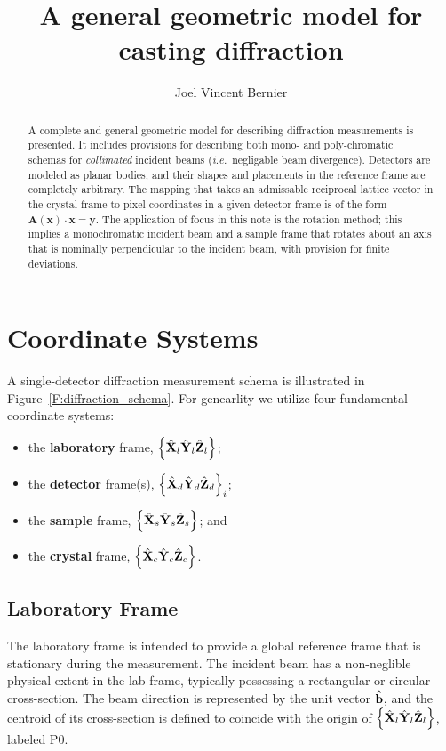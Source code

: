 \documentclass[12pt,letterpaper,final]{amsart}
\author{Joel Vincent Bernier}
\title{A general geometric model for casting diffraction}
\newcommand{\mbm}[1]{\ensuremath{\mbox{\boldmath$#1$}}}
\newcommand{\bhat}{\ensuremath{\hat{\mbm{\mathrm{b}}}}}
\newcommand{\Pzero}{\ensuremath{\mathrm{P0}}}
\newcommand{\Xl}{\ensuremath{\hat{\mbm{\mathrm{X}}}_l}}
\newcommand{\Yl}{\ensuremath{\hat{\mbm{\mathrm{Y}}}_l}}
\newcommand{\Zl}{\ensuremath{\hat{\mbm{\mathrm{Z}}}_l}}
\newcommand{\labframe}{\ensuremath{\left\{\Xl\Yl\Zl\right\}}}
\newcommand{\Xd}{\ensuremath{\hat{\mbm{\mathrm{X}}}_d}}
\newcommand{\Yd}{\ensuremath{\hat{\mbm{\mathrm{Y}}}_d}}
\newcommand{\Zd}{\ensuremath{\hat{\mbm{\mathrm{Z}}}_d}}
\newcommand{\detframe}{\ensuremath{\left\{\Xd\Yd\Zd\right\}}}
\newcommand{\Xs}{\ensuremath{\hat{\mbm{\mathrm{X}}}_s}}
\newcommand{\Ys}{\ensuremath{\hat{\mbm{\mathrm{Y}}}_s}}
\newcommand{\Zs}{\ensuremath{\hat{\mbm{\mathrm{Z}}}_s}}
\newcommand{\samframe}{\ensuremath{\left\{\Xs\Ys\Zs\right\}}}
\newcommand{\Xc}{\ensuremath{\hat{\mbm{\mathrm{X}}}_c}}
\newcommand{\Yc}{\ensuremath{\hat{\mbm{\mathrm{Y}}}_c}}
\newcommand{\Zc}{\ensuremath{\hat{\mbm{\mathrm{Z}}}_c}}
\newcommand{\xtlframe}{\ensuremath{\left\{\Xc\Yc\Zc\right\}}}
\newcommand{\figref}[1]{Figure~\ref{#1}}
\newcommand{\ie}{{\em i.e.}}
\begin{document}
\maketitle
\begin{abstract}
A complete and general geometric model for describing diffraction
measurements is presented.  It includes provisions for describing both
mono- and poly-chromatic schemas for {\em collimated} incident beams
(\ie\ negligable beam divergence).  Detectors are modeled as planar
bodies, and their shapes and placements in the reference frame are
completely arbitrary.  The mapping that takes an admissable reciprocal
lattice vector in the crystal frame to pixel coordinates in a given
detector frame is of the form $\mathbf{A}(\mathbf{x})\cdot\mathbf{x} =
\mathbf{y}$.  The application of focus in this note is the rotation
method; this implies a monochromatic incident beam and a sample frame
that rotates about an axis that is nominally perpendicular to the
incident beam, with provision for finite deviations.
\end{abstract}

\section{Coordinate Systems}

A single-detector diffraction measurement schema is illustrated in
\figref{F:diffraction_schema}.  For genearlity we utilize four
fundamental coordinate systems:
\begin{itemize}
  \item the {\bf laboratory} frame, \labframe;
  \item the {\bf detector} frame(s), $\detframe_i$;
  \item the {\bf sample} frame, \samframe; and
  \item the {\bf crystal} frame, \xtlframe.
\end{itemize}

\subsection{Laboratory Frame}\label{S:laboratory}
The laboratory frame is intended to provide a global reference frame
that is stationary during the measurement.  The incident beam has a
non-neglible physical extent in the lab frame, typically possessing a
rectangular or circular cross-section.  The beam direction is
represented by the unit vector \bhat, and the centroid of its
cross-section is defined to coincide with the origin of \labframe,
labeled \Pzero.
\end{document}
